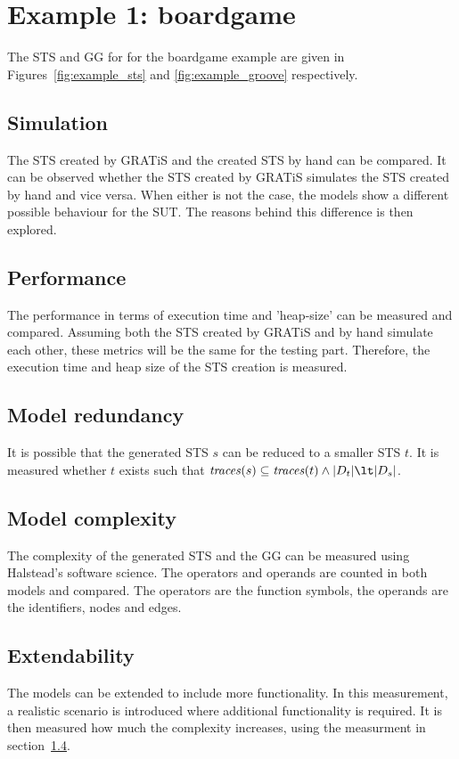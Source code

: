 \section{Example 1: boardgame}
The STS and GG for for the boardgame example are given in Figures~\ref{fig:example_sts} and \ref{fig:example_groove} respectively. 

\subsection{Simulation}
The STS created by GRATiS and the created STS by hand can be compared. It can be observed whether the STS created by GRATiS simulates the STS created by hand and vice versa. When either is not the case, the models show a different possible behaviour for the SUT. The reasons behind this difference is then explored.

\subsection{Performance}
The performance in terms of execution time and 'heap-size' can be measured and compared. Assuming both the STS created by GRATiS and by hand simulate each other, these metrics will be the same for the testing part. Therefore, the execution time and heap size of the STS creation is measured.

\subsection{Model redundancy}
It is possible that the generated STS $s$ can be reduced to a smaller STS $t$. It is measured whether $t$ exists such that $\mathit{traces}(s) \subseteq \mathit{traces}(t) \land |\Switches_t| \lt |\Switches_s|$.

\subsection{Model complexity}\label{sec:complexity_measurement}
The complexity of the generated STS and the GG can be measured using Halstead's software science. The operators and operands are counted in both models and compared. The operators are the function symbols, the operands are the identifiers, nodes and edges. 

\subsection{Extendability}
The models can be extended to include more functionality. In this measurement, a realistic scenario is introduced where additional functionality is required. It is then measured how much the complexity increases, using the measurment in section~\ref{sec:complexity_measurement}.

